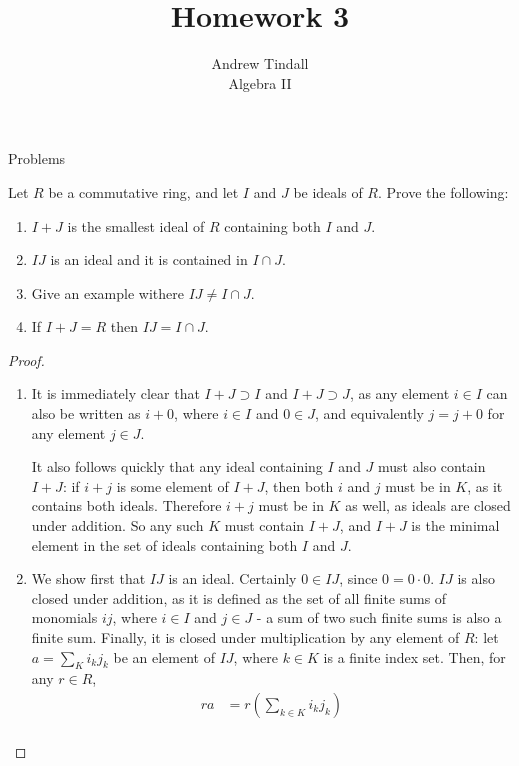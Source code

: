 \documentclass[12pt]{article}
\theoremstyle{definition}
\newenvironment{problem}[2][Problem]{\begin{trivlist}
\item[\hskip \labelsep {\bfseries #1}\hskip \labelsep {\bfseries #2.}]}{\end{trivlist}}
\begin{document}
 
 
\title{Homework 3}
\author{Andrew Tindall\\
	Algebra II}
 
\maketitle
\begin{section}{Problems}
\begin{problem}{1}
Let $R$ be a commutative ring, and let $I$ and $J$ be ideals of $R$. Prove the following:
\begin{enumerate}[label=(\alph*)]
    \item $I + J$ is the smallest ideal of $R$ containing both $I$ and $J$.
    \item $IJ$ is an ideal and it is contained in $I \cap J$.
    \item Give an example withere $IJ \neq I \cap J$.
    \item If $I + J = R$ then $IJ = I \cap J$.
\end{enumerate}
\end{problem}
\begin{proof}
\begin{enumerate}[label=(\alph*)]
    \item It is immediately clear that $I + J \supset I$ and $I + J \supset J$, as any element $i \in I$ can also be written as $i + 0$, where $i \in I$ and $0 \in J$, and equivalently $j = j+0$ for any element $j \in J$.
    \par It also follows quickly that any ideal containing $I$ and $J$ must also contain $I + J$: if $i + j$ is some element of $I + J$, then both $i$ and $j$ must be in $K$, as it contains both ideals. Therefore $i+j$ must be in $K$ as well, as ideals are closed under addition. So any such $K$ must contain $I+J$, and $I + J$ is the minimal element in the set of ideals containing both $I$ and $J$.
    \item We show first that $IJ$ is an ideal. Certainly $0 \in IJ$, since $0 = 0 \cdot 0$. $IJ$ is also closed under addition, as it is defined as the set of all finite sums of monomials $ij$, where $i \in I$ and $j \in J$ - a sum of two such finite sums is also a finite sum. Finally, it is closed under multiplication by any element of $R$: let $a = \sum_K i_kj_k$ be an element of $IJ$, where $k \in K$ is a finite index set.  Then, for any $r \in R$,
    \begin{align*}
        ra &= r \left ( \sum_{k \in K} i_k j_k \right )\\

\end{align*}
\end{enumerate}
\end{proof}
\end{section}
\end{document}
